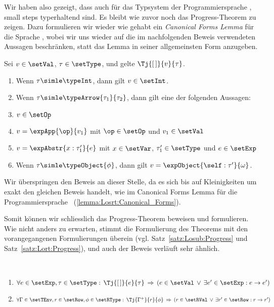Wir haben also gezeigt, dass auch f\"ur das Typsystem der Programmiersprache \Losrt, small steps typerhaltend sind. Es bleibt
wie zuvor noch das Progress-Theorem zu zeigen. Dazu formulieren wir wieder wie gehabt ein {\em Canonical Forms Lemma} f\"ur
die Sprache \Losrt, wobei wir uns wieder auf die im nachfolgenden Beweis verwendeten Aussagen beschr\"anken, statt das Lemma
in seiner allgemeinsten Form anzugeben.

\begin{lemma} \label{lemma:Losrt:Canonical_Forms}
  Sei $v\in\setVal$, $\tau\in\setType$, und gelte $\Tj{[\,]}{v}{\tau}$.
  \begin{enumerate}
    \item Wenn $\tau \simle \typeInt$, dann gilt $v\in\setInt$.

    \item Wenn $\tau \simle \typeArrow{\tau_1}{\tau_2}$, dann gilt eine der folgenden Aussagen:
          \PROOFCASEbeg
            \item $v\in\setOp$
            \item $v=\expApp{\op}{v_1}$ mit $\op\in\setOp$ und $v_1\in\setVal$
            \item $v=\expAbstr{x:\tau_1'}{e}$ mit $x\in\setVar$, $\tau_1'\in\setType$ und $e\in\setExp$
          \PROOFCASEend

    \item Wenn $\tau \simle \typeObject{\phi}$, dann gilt $v=\expObject{\self:\tau'}{\omega}$.
  \end{enumerate}
\end{lemma}

\begin{beweis}
  Wir \"uberspringen den Beweis an dieser Stelle, da es sich bis auf Kleinigkeiten um exakt den gleichen Beweis
  handelt, wie im Canonical Forms Lemma f\"ur die Programmiersprache \Lort\ (\ref{lemma:Losrt:Canonical_Forms}).
\end{beweis}

Somit k\"onnen wir schliesslich das Progress-Theorem beweisen und formulieren. Wie nicht anders zu erwarten,
stimmt die Formulierung des Theorems mit den vorangegangenen Formulierungen \"uberein (vgl. Satz~\ref{satz:Losub:Progress}
und Satz~\ref{satz:Lort:Progress}), und auch der Beweis verl\"auft sehr \"ahnlich.

\begin{satz} \label{satz:Losrt:Progress}  \
  \begin{enumerate}
    \item $\forall e\in\setExp, \tau\in\setType:\, \Tj{[\,]}{e}{\tau}
           \,\Rightarrow\,(e\in\setVal\,\vee\,\exists e'\in\setExp: e \to e')$
    \item $\forall \Gamma\in\setTEnv,r\in\setRow, \phi\in\setRType:\, \Tj{\Gamma^+}{r}{\phi}
           \,\Rightarrow\,(r\in\setRVal\,\vee\,\exists r'\in\setRow: r \to r')$
  \end{enumerate}
\end{satz}

